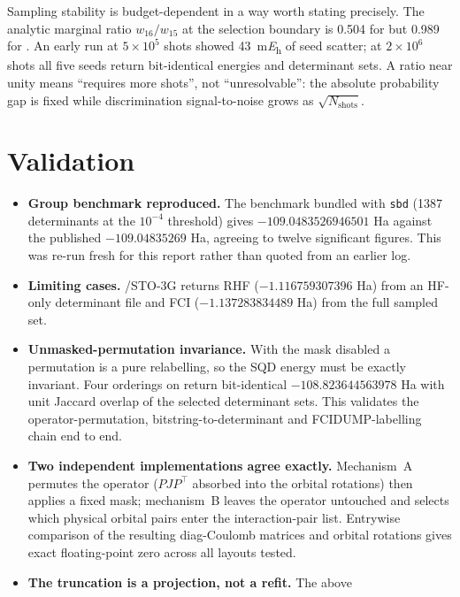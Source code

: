 \documentclass[11pt,a4paper]{article}
\begin{document}
Sampling stability is budget-dependent in a way worth stating precisely. The
analytic marginal ratio $w_{16}/w_{15}$ at the selection boundary is 0.504
for  but 0.989 for . An early  run at
$5\times10^{5}$ shots showed \SI{43}{\milli\hartree} of seed scatter; at
$2\times10^{6}$ shots all five seeds return bit-identical energies and
determinant sets. A ratio near unity means ``requires more shots'', not
``unresolvable'': the absolute probability gap is fixed while discrimination
signal-to-noise grows as $\sqrt{N_{\text{shots}}}$.

\FloatBarrier
\section{Validation}

\begin{itemize}\itemsep3pt
  \item \textbf{Group benchmark reproduced.} The  benchmark bundled
        with \texttt{sbd} (1387 determinants at the $10^{-4}$ threshold)
        gives $-109.0483526946501$ Ha against the published
        $-109.04835269$ Ha, agreeing to twelve significant figures. This was
        re-run fresh for this report rather than quoted from an earlier log.
  \item \textbf{Limiting cases.} /STO-3G returns RHF
        ($-1.116759307396$ Ha) from an HF-only determinant file and FCI
        ($-1.137283834489$ Ha) from the full sampled set.
  \item \textbf{Unmasked-permutation invariance.} With the mask disabled a
        permutation is a pure relabelling, so the SQD energy must be exactly
        invariant. Four orderings on  return bit-identical
        $-108.823644563978$ Ha with unit Jaccard overlap of the selected
        determinant sets. This validates the operator-permutation,
        bitstring-to-determinant and FCIDUMP-labelling chain end to end.
  \item \textbf{Two independent implementations agree exactly.} Mechanism~A
        permutes the operator ($PJP^{\top}$ absorbed into the orbital
        rotations) then applies a fixed mask; mechanism~B leaves the operator
        untouched and selects which physical orbital pairs enter the
        interaction-pair list. Entrywise comparison of the resulting
        diag-Coulomb matrices and orbital rotations gives exact
        floating-point zero across all layouts tested.
  \item \textbf{The truncation is a projection, not a refit.} The above

\end{itemize}
\end{document}
